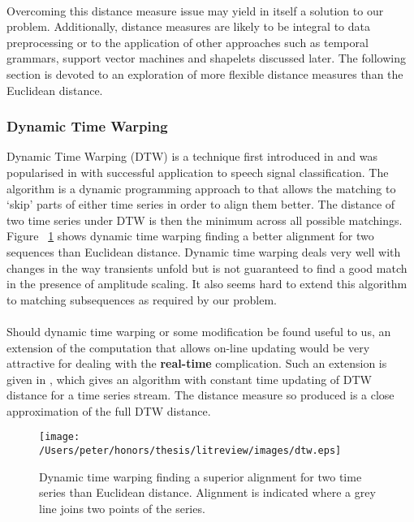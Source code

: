 	\paragraph{}
	Overcoming this distance measure issue may yield in itself a solution to our problem. Additionally, distance measures are likely to be integral to data preprocessing or to the application of other approaches such as temporal grammars, support vector machines and shapelets discussed later. The following section is devoted to an exploration of more flexible distance measures than the Euclidean distance.
	
	\subsubsection{Dynamic Time Warping}
	Dynamic Time Warping (DTW) is a technique first introduced in \citep{sakoe1978dynamic} and was popularised in \citep{berndt1994using} with successful application to speech signal classification. The algorithm is a dynamic programming approach to that allows the matching to `skip' parts of either time series in order to align them better. The distance of two time series under DTW is then the minimum across all possible matchings. Figure ~\ref{fig:dtwinaction} shows dynamic time warping finding a better alignment for two sequences than Euclidean distance. Dynamic time warping deals very well with changes in the way transients unfold but is not guaranteed to find a good match in the presence of amplitude scaling. It also seems hard to extend this algorithm to matching subsequences as required by our problem.
	\paragraph{}
	Should dynamic time warping or some modification be found useful to us, an extension of the computation that allows on-line updating would be very attractive for dealing with the \textbf{real-time} complication. Such an extension is given in \citep{capitani2007warping}, which gives an algorithm with constant time updating of DTW distance for a time series stream. The distance measure so produced is a close approximation of the full DTW distance.
	
	\begin{figure}[h!]
			\label{fig:dtwinaction}
	\centering
	\texttt{[image: /Users/peter/honors/thesis/litreview/images/dtw.eps]}
	\caption{Dynamic time warping finding a superior alignment for two time series than Euclidean distance. Alignment is indicated where a grey line joins two points of the series.}
	\end{figure}

